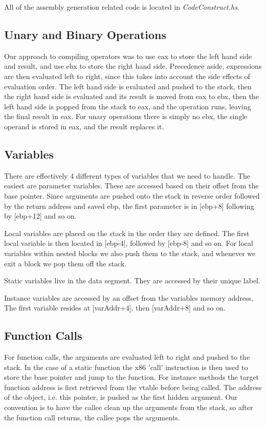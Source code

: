 \documentclass[12pt,letterpaper]{article}
\begin{document}
All of the assembly generation related code is located in \emph{CodeConstruct.hs}.

\subsection{Unary and Binary Operations}
Our approach to compiling operators was to use eax to store the left hand side and result, and use ebx to store the right hand side.
Precedence aside, expressions are then evaluated left to right, since this takes into account the side effects of evaluation order.
The left hand side is evaluated and pushed to the stack, then the right hand side is evaluated and its result is moved from eax to ebx, then the left hand side is popped from the stack to eax, and the operation runs, leaving the final result in eax.
For unary operations there is simply no ebx, the single operand is stored in eax, and the result replaces it.

\subsection{Variables}
There are effectively 4 different types of variables that we need to handle.
The easiest are parameter variables. These are accessed based on their offset from the base pointer.
Since arguments are pushed onto the stack in reverse order followed by the return address and saved ebp, the first parameter is in [ebp+8] following by [ebp+12] and so on.

Local variables are placed on the stack in the order they are defined. The first local variable is then located in [ebp-4], followed by [ebp-8] and so on.
For local variables within nested blocks we also push them to the stack, and whenever we exit a block we pop them off the stack.

Static variables live in the data segment. They are accessed by their unique label.

Instance variables are accessed by an offset from the variables memory address, The first variable resides at [varAddr+4], then [varAddr+8] and so on.

\subsection{Function Calls}
For function calls, the arguments are evaluated left to right and pushed to the stack.
In the case of a static function the x86 'call' instruction is then used to store the base pointer and jump to the function.
For instance methods the target function address is first retrieved from the vtable before being called.
The address of the object, i.e. this pointer, is pushed as the first hidden argument.
Our convention is to have the callee clean up the arguments from the stack, so after the function call returns, the callee pops the arguments.
\end{document}
